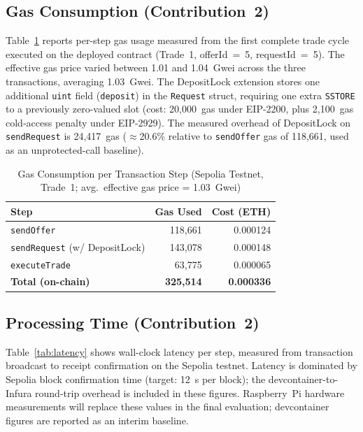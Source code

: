 \documentclass{IEEEoj}
\begin{document}
\subsection{Gas Consumption (Contribution~2)}

Table~\ref{tab:gas} reports per-step gas usage measured from the first
complete trade cycle executed on the deployed contract (Trade~1,
offerId~=~5, requestId~=~5).
The effective gas price varied between 1.01 and 1.04~Gwei across the three
transactions, averaging 1.03~Gwei.
The DepositLock extension stores one additional \texttt{uint} field
(\texttt{deposit}) in the \texttt{Request} struct, requiring one extra
\texttt{SSTORE} to a previously zero-valued slot (cost: 20,000~gas under
EIP-2200, plus 2,100~gas cold-access penalty under EIP-2929).
The measured overhead of DepositLock on \texttt{sendRequest} is
24,417~gas ($\approx$20.6\% relative to \texttt{sendOffer} gas of 118,661,
used as an unprotected-call baseline).

\begin{table}[t]
\caption{Gas Consumption per Transaction Step (Sepolia Testnet, Trade~1;
         avg.\ effective gas price = 1.03~Gwei)}
\label{tab:gas}
\centering
\begin{tabular}{lrr}
\toprule
\textbf{Step} & \textbf{Gas Used} & \textbf{Cost (ETH)} \\
\midrule
\texttt{sendOffer}                    & 118,661 & 0.000124 \\
\texttt{sendRequest} (w/ DepositLock) & 143,078 & 0.000148 \\
\texttt{executeTrade}                 &  63,775 & 0.000065 \\
\midrule
\textbf{Total (on-chain)}             & \textbf{325,514} & \textbf{0.000336} \\
\bottomrule
\end{tabular}
\end{table}

\subsection{Processing Time (Contribution~2)}

Table~\ref{tab:latency} shows wall-clock latency per step, measured from
transaction broadcast to receipt confirmation on the Sepolia testnet.
Latency is dominated by Sepolia block confirmation time (target: 12~s per
block); the devcontainer-to-Infura round-trip overhead is included in
these figures.
Raspberry~Pi hardware measurements will replace these values in the final
evaluation; devcontainer figures are reported as an interim baseline.
\end{document}
